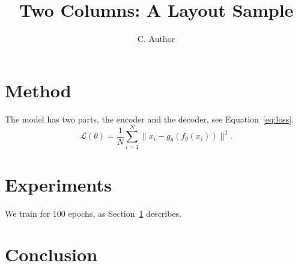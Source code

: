 \documentclass[10pt,twocolumn]{article}
\title{Two Columns: A Layout Sample}
\author{C. Author}
\date{}
\begin{document}
\maketitle
\section{Method}\label{sec:method}
The model has two parts, the encoder and the decoder, see Equation~\eqref{eq:loss}.
\lipsum[1]
\begin{equation}\label{eq:loss}
  \mathcal{L}(\theta) = \frac{1}{N}\sum_{i=1}^{N} \lVert x_i - g_\theta(f_\theta(x_i)) \rVert^2 .
\end{equation}
\lipsum[2-3]
\section{Experiments}
We train for 100 epochs, as Section~\ref{sec:method} describes.
\lipsum[4-6]
\section{Conclusion}
\lipsum[7-8]
\end{document}
